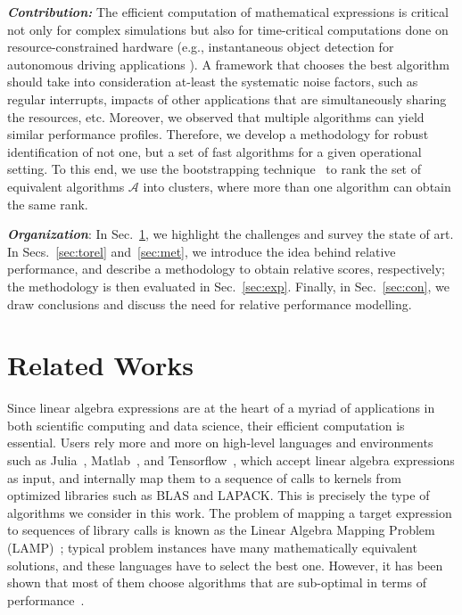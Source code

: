 \documentclass[conference]{IEEEtran}
\begin{document}
\textbf{\textit{Contribution:} }The efficient computation of mathematical expressions is critical not only for complex
simulations but also for time-critical computations done on resource-constrained hardware \cite{towardsEdgeComputing}
(e.g., instantaneous object detection for autonomous driving applications \cite{connectedvehicles}). A framework that
chooses the best algorithm should take into consideration at-least the systematic noise factors, such as  regular
interrupts, impacts of  other applications that are simultaneously sharing the resources, etc. Moreover, we observed that
multiple algorithms can yield similar performance profiles. Therefore,  we develop a methodology for robust identification of not one, but a set of  fast algorithms for a given operational setting. To this end, we use the bootstrapping technique~\cite{bootstrap} to rank the set of equivalent algorithms $\mathcal{A}$ into clusters, where more than one algorithm can obtain the same rank.

\textit{\textbf{Organization}}: In Sec.~\ref{sec:rel}, we highlight the challenges and survey the state of art. In
Secs.~\ref{sec:torel} and~\ref{sec:met}, we introduce the idea behind relative performance, and describe a methodology
to obtain relative scores, respectively; the methodology is then evaluated in Sec.~\ref{sec:exp}.
 Finally, in Sec.~\ref{sec:con}, we
draw conclusions and discuss the need for relative performance modelling. 
  

\section{Related Works}
\label{sec:rel}

Since linear algebra expressions are at the heart of a myriad of
applications in both scientific computing and data science,
their efficient computation is essential. Users rely more and more on high-level languages and
environments such as Julia~\cite{julia}, Matlab~\cite{MatlabOTB}, and Tensorflow~\cite{tensorflow}, which accept linear
algebra expressions as input, and internally map them to a sequence of calls to kernels from optimized libraries such as
BLAS and LAPACK. This is precisely the type of algorithms we consider in this work. The problem of mapping a target
expression to sequences of library calls is known as the Linear Algebra Mapping Problem (LAMP)~\cite{psarras2019linear};
typical problem instances have many mathematically equivalent solutions, and these languages have to select the best
one. However, it has been shown that most of them choose algorithms that are sub-optimal in terms of performance~\cite{psarras2019linear,barthels2019linnea}.
\end{document}
